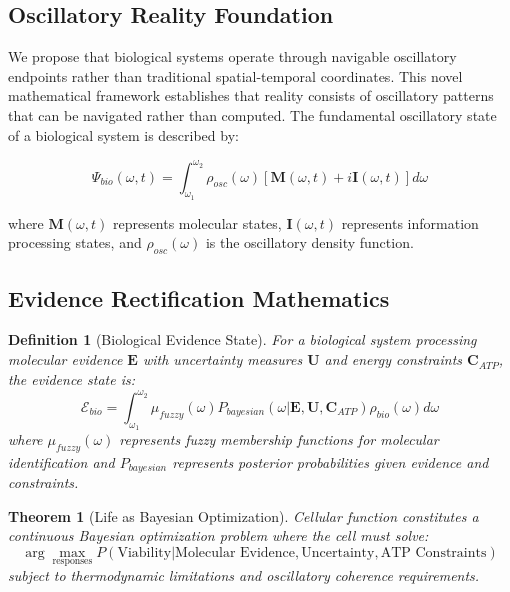 \documentclass[12pt,a4paper]{article}
\newtheorem{theorem}{Theorem}
\newtheorem{definition}{Definition}
\begin{document}
\subsection{Oscillatory Reality Foundation}

We propose that biological systems operate through navigable oscillatory endpoints rather than traditional spatial-temporal coordinates. This novel mathematical framework establishes that reality consists of oscillatory patterns that can be navigated rather than computed. The fundamental oscillatory state of a biological system is described by:

\begin{equation}
\Psi_{bio}(\omega, t) = \int_{\omega_1}^{\omega_2} \rho_{osc}(\omega) [\mathbf{M}(\omega, t) + i\mathbf{I}(\omega, t)] d\omega
\end{equation}

where $\mathbf{M}(\omega, t)$ represents molecular states, $\mathbf{I}(\omega, t)$ represents information processing states, and $\rho_{osc}(\omega)$ is the oscillatory density function.

\subsection{Evidence Rectification Mathematics}

\begin{definition}[Biological Evidence State]
For a biological system processing molecular evidence $\mathbf{E}$ with uncertainty measures $\mathbf{U}$ and energy constraints $\mathbf{C}_{ATP}$, the evidence state is:
\begin{equation}
\mathcal{E}_{bio} = \int_{\omega_1}^{\omega_2} \mu_{fuzzy}(\omega) P_{bayesian}(\omega | \mathbf{E}, \mathbf{U}, \mathbf{C}_{ATP}) \rho_{bio}(\omega) d\omega
\end{equation}
where $\mu_{fuzzy}(\omega)$ represents fuzzy membership functions for molecular identification and $P_{bayesian}$ represents posterior probabilities given evidence and constraints.
\end{definition}

\begin{theorem}[Life as Bayesian Optimization]
Cellular function constitutes a continuous Bayesian optimization problem where the cell must solve:
\begin{equation}
\arg\max_{\text{responses}} P(\text{Viability} | \text{Molecular Evidence}, \text{Uncertainty}, \text{ATP Constraints})
\end{equation}
subject to thermodynamic limitations and oscillatory coherence requirements.
\end{theorem}
\end{document}
